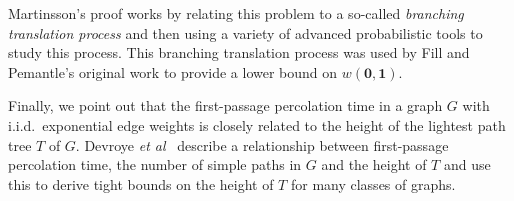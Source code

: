 \documentclass[a4paper,UKenglish]{lipics-v2016}
\newcommand{\zero}{\mathbf{0}}
\newcommand{\one}{\mathbf{1}}
\newcommand{\etal}{\emph{et al}}
\begin{document}
Martinsson's proof \cite{martinsson:unoriented} works by relating this
problem to a so-called \emph{branching translation process} and then
using a variety of advanced probabilistic tools to study this process.
This branching translation process was used by Fill and Pemantle's
original work to provide a lower bound on $w(\zero,\one)$.

Finally, we point out that the first-passage percolation time in a graph
$G$ with i.i.d.\ exponential edge weights is closely related to the height
of the lightest path tree $T$ of $G$. Devroye \etal\ \cite{devroye.dujmovic.ea:notes}
describe a relationship between first-passage percolation time, the
number of simple paths in $G$ and the height of $T$ and use this to
derive tight bounds on the height of $T$ for many classes of graphs.


\end{document}
